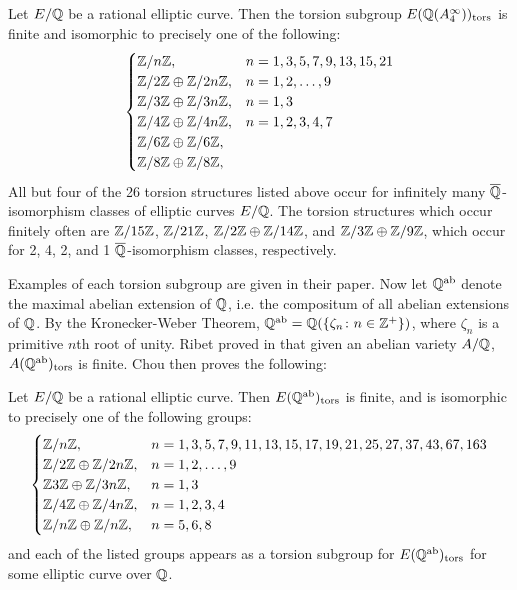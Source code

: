 \begin{thm}
Let $E/\mathbb{Q}$ be a rational elliptic curve. Then the torsion subgroup $E(\mathbb{Q}(A_4^\infty))_{\text{tors}}$ is finite and isomorphic to precisely one of the following:
	\[
	\begin{cases}
	\mathbb{Z}/n\mathbb{Z}, & n= 1, 3, 5, 7, 9, 13, 15, 21 \\
	\mathbb{Z}/2\mathbb{Z} \oplus \mathbb{Z}/2n\mathbb{Z}, & n= 1, 2, \ldots, 9 \\
	\mathbb{Z}/3\mathbb{Z} \oplus \mathbb{Z}/3n\mathbb{Z}, & n= 1, 3 \\
	\mathbb{Z}/4\mathbb{Z} \oplus \mathbb{Z}/4n\mathbb{Z}, & n= 1, 2, 3, 4, 7 \\
	\mathbb{Z}/6\mathbb{Z} \oplus \mathbb{Z}/6\mathbb{Z}, \\
	\mathbb{Z}/8\mathbb{Z} \oplus \mathbb{Z}/8\mathbb{Z}, 
	\end{cases}
	\]
All but four of the 26 torsion structures listed above occur for infinitely many $\overline{\mathbb{Q}}$-isomorphism classes of elliptic curves $E/\mathbb{Q}$. The torsion structures which occur finitely often are $\mathbb{Z}/15\mathbb{Z}$, $\mathbb{Z}/21\mathbb{Z}$, $\mathbb{Z}/2\mathbb{Z} \oplus \mathbb{Z}/14\mathbb{Z}$, and $\mathbb{Z}/3\mathbb{Z} \oplus \mathbb{Z}/9\mathbb{Z}$, which occur for 2, 4, 2, and 1 $\overline{\mathbb{Q}}$-isomorphism classes, respectively. 
\end{thm}


Examples of each torsion subgroup are given in their paper. Now let $\mathbb{Q}^{\operatorname{ab}}$ denote the maximal abelian extension of $\mathbb{Q}$, i.e. the compositum of all abelian extensions of $\mathbb{Q}$. By the Kronecker-Weber Theorem, $\mathbb{Q}^{\operatorname{ab}}= \mathbb{Q}(\{ \zeta_n \colon n \in \mathbb{Z}^+ \})$, where $\zeta_n$ is a primitive $n$th root of unity. Ribet proved in \cite{ribet81} that given an abelian variety $A/\mathbb{Q}$, $A(\mathbb{Q}^{\operatorname{ab}})_{\text{tors}}$ is finite. Chou then proves the following:


\begin{thm}
Let $E/\mathbb{Q}$ be a rational elliptic curve. Then $E(\mathbb{Q}^{\operatorname{ab}})_{\text{tors}}$ is finite, and is isomorphic to precisely one of the following groups:
	\[
	\begin{cases}
	\mathbb{Z}/n\mathbb{Z}, & n= 1, 3, 5, 7, 9, 11, 13, 15, 17, 19, 21, 25, 27, 37, 43, 67, 163 \\
	\mathbb{Z}/2\mathbb{Z} \oplus \mathbb{Z}/2n\mathbb{Z}, & n= 1, 2, \ldots, 9 \\
	\mathbb{Z}3\mathbb{Z} \oplus \mathbb{Z}/3n\mathbb{Z}, & n= 1, 3 \\
	\mathbb{Z}/4\mathbb{Z} \oplus \mathbb{Z}/4n\mathbb{Z}, & n= 1, 2, 3, 4 \\
	\mathbb{Z}/n\mathbb{Z} \oplus \mathbb{Z}/n\mathbb{Z}, & n= 5, 6, 8
	\end{cases}
	\]
and each of the listed groups appears as a torsion subgroup for $E(\mathbb{Q}^{\operatorname{ab}})_{\text{tors}}$ for some elliptic curve over $\mathbb{Q}$. 
\end{thm}


